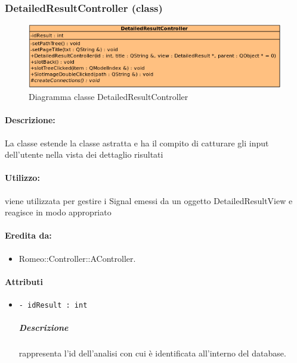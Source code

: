 	\subsubsection{DetailedResultController (class)}
	\begin{figure}[!h]
		\centering
		\includegraphics[scale=2.75]{./Content/Immagini/controller/DetailedResultController.png}
		\caption{Diagramma classe DetailedResultController}
	\end{figure}
	\paragraph{Descrizione:} La classe estende la classe astratta  e ha il compito di catturare gli input dell'utente nella vista dei dettaglio risultati
	\paragraph{Utilizzo:} viene utilizzata per gestire i Signal\g{} emessi da un oggetto DetailedResultView e reagisce in modo appropriato
	\paragraph{Eredita da:}
		\begin{itemize}
			\item Romeo::Controller::AController.
		\end{itemize}
	\paragraph{Attributi}
		\begin{itemize}
			\item \color{teal} \verb!- idResult : int!
			\color{black}
			\subparagraph{Descrizione} rappresenta l'id dell'analisi con cui è identificata all'interno del database.
		\end{itemize}
